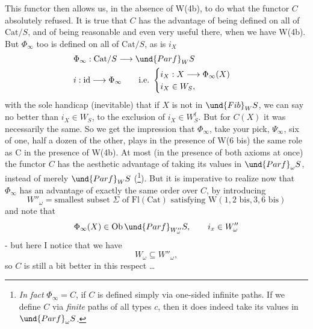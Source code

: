 This functor then allows us, in the absence of W(4b), to do what the functor $C$ absolutely refused. It is true that $C$ has the advantage of being defined on all of $\mathrm{Cat}/S$, and of being
reasonable and even very useful there, when we have W(4b). But $\Phi_\infty$ too is defined on all of $\mathrm{Cat}/S$, as is $i_X$
\[
\begin{aligned}
&\Phi_\infty : \mathrm{Cat}/S \longrightarrow \und{Parf}_W S\\
&i : \mathrm{id} \longrightarrow \Phi_\infty \qquad \text{i.e.}\ \begin{cases} i_X : X \longrightarrow \Phi_\infty(X)\\ i_X \in W_S, \end{cases}
\end{aligned}
\]
with the sole handicap (inevitable) that if $X$ is not in $\und{Fib}_W S$, we can say no better than $i_X \in W_S$, to the exclusion of $i_X \in W_S^{\mathrm{f}}$. But for $C(X)$ it was necessarily the same. So we get the impression that $\Phi_\infty$, take your pick, $\Psi_\infty$, six of one, half a dozen of the other, plays in the presence of W(6 bis) the same role as C in the presence of W(4b). At most (in the presence of both axioms at once) the functor $C$ has the aesthetic advantage of taking its values in $\und{Parf}_\omega S$, instead of merely $\und{Parf}_W S$ (\footnote[93]{\textit{In fact} $\Phi_\infty = C$, if $C$ is defined simply via one-sided infinite paths. If we define $C$ via \textit{finite} paths of all types $c$, then it does indeed take its values in $\und{Parf}_\omega S$.}). But it is imperative to %
realize now that $\Phi_\infty$ has an advantage of exactly the same order over $C$, by introducing
\[
W''_\omega = \text{smallest subset } \Sigma \text{ of } \mathrm{Fl}(\mathrm{Cat}) \text{ satisfying } \mathrm{W}(1, 2\text{ bis}, 3, 6\text{ bis})
\]
and note that
\[
\Phi_\infty(X) \in \mathrm{Ob}\,\und{Parf}_{W''_\omega} S, \qquad i_x \in W''_\omega %
\]
- but here I notice that we have
\[
W_\omega \subseteq W''_\omega,
\]
so $C$ is still a bit better in this respect \ldots

